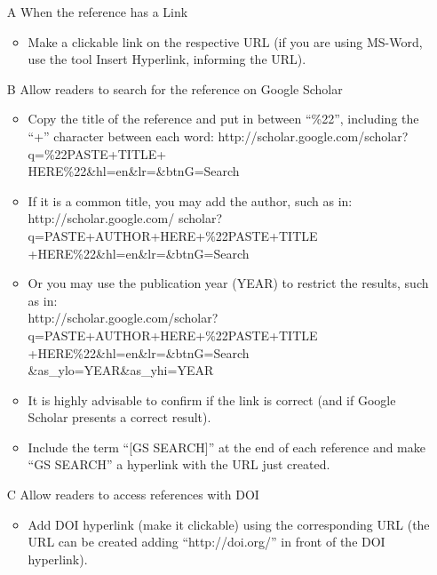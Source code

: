 \documentclass[english, spanish, brazilian]{RBIEarticle} %
\begin{document}
\begin{enumerate}
    \item[A] When the reference has a Link
    \begin{itemize}
        \item Make a clickable link on the respective URL (if you are using MS-Word, use the tool Insert Hyperlink, informing the URL).
    \end{itemize}
    \item[B] Allow readers to search for the reference on Google Scholar
    \begin{itemize}
        \item Copy the title of the reference and put in between ``\%22'', including the ``+'' character between each word: http://scholar.google.com/scholar?q=\%22PASTE+TITLE+\\HERE\%22\&hl=en\&lr=\&btnG=Search
        \item If it is a common title, you may add the author, such as in: \\http://scholar.google.com/ scholar?q=PASTE+AUTHOR+HERE+\%22PASTE+TITLE\\+HERE\%22\&hl=en\&lr=\&btnG=Search
        \item Or you may use the publication year (YEAR) to restrict the results, such as in:\\ http://scholar.google.com/scholar?
        q=PASTE+AUTHOR+HERE+\%22PASTE+TITLE\\+HERE\%22\&hl=en\&lr=\&btnG=Search \&as\_ylo=YEAR\&as\_yhi=YEAR
        \item It is highly advisable to confirm if the link is correct (and if Google Scholar presents a correct result).
        \item Include the term ``[GS SEARCH]'' at the end of each reference and make “GS SEARCH” a hyperlink with the URL just created.
    \end{itemize}
    \item[C] Allow readers to access references with DOI
    \begin{itemize}
        \item Add DOI hyperlink (make it clickable) using the corresponding URL (the URL can be created adding ``http://doi.org/'' in front of the DOI hyperlink).
    \end{itemize}
\end{enumerate}
\end{document}
